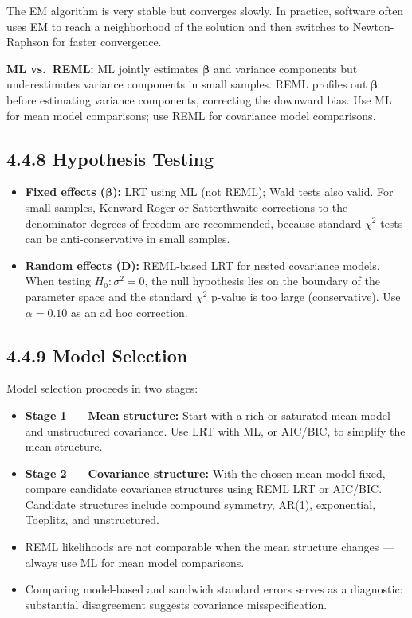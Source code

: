 \documentclass[11pt]{article}
\newcommand{\bbeta}{\boldsymbol{\beta}}
\begin{document}
The EM algorithm is very stable but converges slowly. In practice, software often uses EM to reach a neighborhood of the solution and then switches to Newton-Raphson for faster convergence.

\textbf{ML vs.\ REML:} ML jointly estimates $\bbeta$ and variance components but underestimates variance components in small samples. REML profiles out $\bbeta$ before estimating variance components, correcting the downward bias. Use ML for mean model comparisons; use REML for covariance model comparisons.

\subsection*{4.4.8 Hypothesis Testing}

\begin{itemize}[leftmargin=2em]
  \item \textbf{Fixed effects ($\bbeta$):} LRT using ML (not REML); Wald tests also valid. For small samples, Kenward-Roger or Satterthwaite corrections to the denominator degrees of freedom are recommended, because standard $\chi^2$ tests can be anti-conservative in small samples.
  \item \textbf{Random effects ($\mathbf{D}$):} REML-based LRT for nested covariance models. When testing $H_0: \sigma^2 = 0$, the null hypothesis lies on the boundary of the parameter space and the standard $\chi^2$ p-value is too large (conservative). Use $\alpha = 0.10$ as an ad hoc correction.
\end{itemize}

\subsection*{4.4.9 Model Selection}

Model selection proceeds in two stages:
\begin{itemize}[leftmargin=2em]
  \item \textbf{Stage 1 --- Mean structure:} Start with a rich or saturated mean model and unstructured covariance. Use LRT with ML, or AIC/BIC, to simplify the mean structure.
  \item \textbf{Stage 2 --- Covariance structure:} With the chosen mean model fixed, compare candidate covariance structures using REML LRT or AIC/BIC. Candidate structures include compound symmetry, AR(1), exponential, Toeplitz, and unstructured.
  \item REML likelihoods are not comparable when the mean structure changes --- always use ML for mean model comparisons.
  \item Comparing model-based and sandwich standard errors serves as a diagnostic: substantial disagreement suggests covariance misspecification.
\end{itemize}
\end{document}
